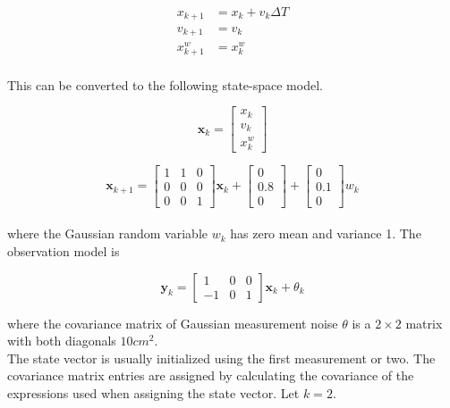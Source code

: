 \documentclass[10pt,conference,compsoc]{IEEEtran}
\newcommand{\mtx}[1] {\bm #1}
\begin{document}
\begin{align}
  x_{k+1} &= x_k + v_k \Delta T \\
  v_{k+1} &= v_k \\
  x_{k+1}^w &= x_k^w
\end{align}
\\
This can be converted to the following state-space model.

\begin{equation}
  \mtx{x}_k = \left[
  \begin{array}{c}
    x_k \\
    v_k \\
    x_k^w
  \end{array} \right]
\end{equation}

\begin{equation}
  \mtx{x}_{k+1} = \left[
  \begin{array}{ccc}
    1 & 1 & 0 \\
    0 & 0 & 0 \\
    0 & 0 & 1
  \end{array} \right] \mtx{x}_k + \left[
  \begin{array}{c}
    0 \\
    0.8 \\
    0
  \end{array} \right] + \left[
  \begin{array}{c}
    0 \\
    0.1 \\
    0
  \end{array} \right] w_k
\end{equation}
\\
where the Gaussian random variable $w_k$ has zero mean and variance 1. The
observation model is

\begin{equation}
  \mtx{y}_k = \left[
  \begin{array}{ccc}
    1 & 0 & 0 \\
    -1 & 0 & 1
  \end{array} \right] \mtx{x}_k + \theta_k
\end{equation}

where the covariance matrix of Gaussian measurement noise $\theta$ is a
$2 \times 2$ matrix with both diagonals $10 cm^2$. \\

The state vector is usually initialized using the first measurement or two. The
covariance matrix entries are assigned by calculating the covariance of the
expressions used when assigning the state vector. Let $k = 2$.
\end{document}
